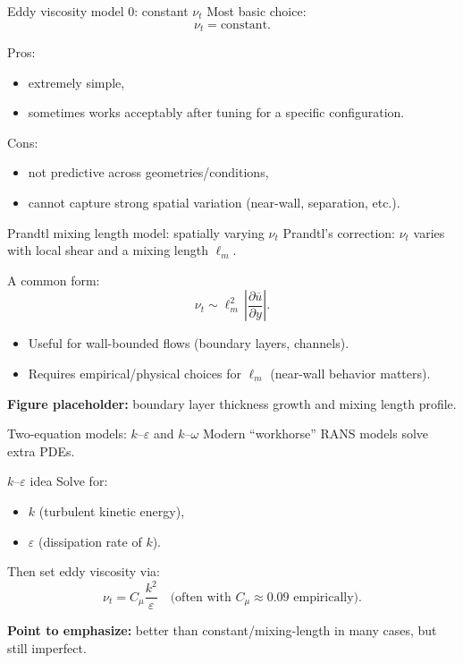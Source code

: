 \documentclass[aspectratio=169]{beamer}
\newcommand{\avg}[1]{\overline{#1}}
\begin{document}
\begin{frame}{Eddy viscosity model 0: constant $\nu_t$}
Most basic choice:
\[
\nu_t = \text{constant}.
\]

Pros:
\begin{itemize}
  \item extremely simple,
  \item sometimes works acceptably after tuning for a specific configuration.
\end{itemize}

Cons:
\begin{itemize}
  \item not predictive across geometries/conditions,
  \item cannot capture strong spatial variation (near-wall, separation, etc.).
\end{itemize}
\end{frame}

\begin{frame}{Prandtl mixing length model: spatially varying $\nu_t$}
Prandtl's correction: $\nu_t$ varies with local shear and a mixing length $\ell_m$.

A common form:
\[
\nu_t \sim \ell_m^2\,\left|\frac{\partial \avg{u}}{\partial y}\right|.
\]

\begin{itemize}
  \item Useful for wall-bounded flows (boundary layers, channels).
  \item Requires empirical/physical choices for $\ell_m$ (near-wall behavior matters).
\end{itemize}

\textbf{Figure placeholder:} boundary layer thickness growth and mixing length profile.
\end{frame}

\begin{frame}{Two-equation models: $k$--$\varepsilon$ and $k$--$\omega$}
Modern ``workhorse'' RANS models solve extra PDEs.

\begin{block}{$k$--$\varepsilon$ idea}
Solve for:
\begin{itemize}
  \item $k$ (turbulent kinetic energy),
  \item $\varepsilon$ (dissipation rate of $k$).
\end{itemize}
Then set eddy viscosity via:
\[
\nu_t = C_\mu \frac{k^2}{\varepsilon}
\quad\text{(often with }C_\mu\approx 0.09\text{ empirically).}
\]
\end{block}

\textbf{Point to emphasize:} better than constant/mixing-length in many cases, but still imperfect.
\end{frame}
\end{document}
